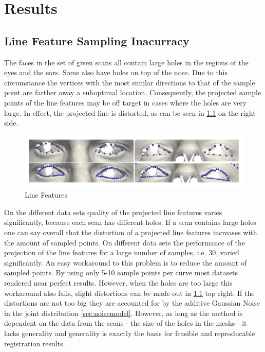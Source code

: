 \chapter{Results}

\section{Line Feature Sampling Inacurracy}
\label{sec:linefeature_inaccuracy}
The faces in the set of given scans all contain large holes in the regions of the eyes and the ears. Some also have holes on top of the nose.
Due to this circumstance the vertices with the most similar directions to that of the sample point are farther away a suboptimal location. 
Consequently, the projected sample points of the line features may be off target in cases where the holes are very large. In effect, the projected line is distorted, as can be seen in \ref{fig:linefeature_comparison} on the right side. 
\begin{figure}[h!]
    \centering
    \includegraphics[width=\textwidth]{./resources/img/linefeatures_eyes.pdf}
    \caption{Line Features}
    \label{fig:linefeature_comparison}
\end{figure}
On the different data sets quality of the projected line features varies significantly, because each scan has different holes. If a scan contains large holes one can say overall that the distortion of a projected line features increases with the amount of sampled points. 
On different data sets the performance of the projection of the line features for a large number of
samples, i.e. 30, varied significantly. 
An easy workaround to this problem is to reduce the amount of sampled points. By using only 5-10 sample points per curve most datasets rendered near perfect results. 
However, when the holes are too large this workaround also fails, slight distortions can be made out in \ref{fig:linefeature_comparison} top right.
If the distortions are not too big they are accounted for by the additive Gaussian Noise in the joint distribution \ref{sec:noisemodel}.
However, as long as the method is dependent on the data from the scans - the size of the holes in the meshs - it lacks generality and generality is exactly the basis for feasible and reproducable registration results.\\

